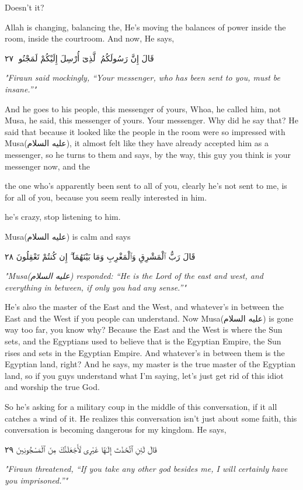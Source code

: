 \documentclass[12pt]{article}
\newcommand{\as}{\textarabic{(عليه السلام)}}
\begin{document}
Doesn't it? 

Allah is changing, balancing the, He's moving the balances of power inside the room, inside the courtroom. And now, He says, 

\textarabic{قَالَ إِنَّ رَسُولَكُمُ ٱلَّذِىٓ أُرْسِلَ إِلَيْكُمْ لَمَجْنُونٌۭ ٢٧}

\textit{"Firaun said mockingly, “Your messenger, who has been sent to you, must be insane.”"}

And he goes to his people, this messenger of yours, Whoa, he called him, not Musa, he said, this messenger of yours. Your messenger. Why did he say that? He said that because it looked like the people in the room were so impressed with Musa\as{}, it almost felt like they have already accepted him as a messenger, so he turns to them and says, by the way, this guy you think is your messenger now, and the 

the one who's apparently been sent to all of you, clearly he's not sent to me, is for all of you, because you seem really interested in him. 

he's crazy, stop listening to him. 

Musa\as{} is calm and says 

\textarabic{قَالَ رَبُّ ٱلْمَشْرِقِ وَٱلْمَغْرِبِ وَمَا بَيْنَهُمَآ ۖ إِن كُنتُمْ تَعْقِلُونَ ٢٨}

\textit{"Musa\as{} responded: “He is the Lord of the east and west, and everything in between, if only you had any sense.”"}

He's also the master of the East and the West, and whatever's in between the East and the West if you people can understand. Now Musa\as{} is gone way too far, you know why? Because the East and the West is where the Sun sets, and the Egyptians used to believe that is the Egyptian Empire, the Sun rises and sets in the Egyptian Empire. And whatever's in between them is the Egyptian land, right? And he says, my master is the true master of the Egyptian land, so if you guys understand what I'm saying, let's just get rid of this idiot and worship the true God. 

So he's asking for a military coup in the middle of this conversation, if it all catches a wind of it. He realizes this conversation isn't just about some faith, this conversation is becoming dangerous for my kingdom. He says, 

\textarabic{قَالَ لَئِنِ ٱتَّخَذْتَ إِلَـٰهًا غَيْرِى لَأَجْعَلَنَّكَ مِنَ ٱلْمَسْجُونِينَ ٢٩}

\textit{"Firaun threatened, “If you take any other god besides me, I will certainly have you imprisoned.”"}
\end{document}
